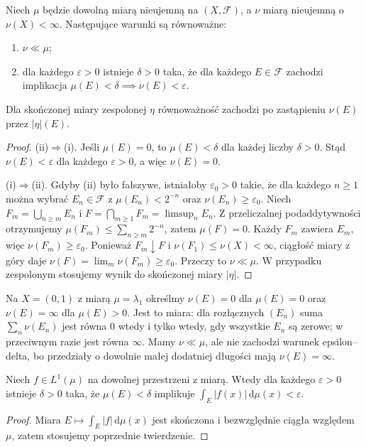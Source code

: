 \begin{twierdzenie}
\label{thm:eps-delta-ac-17}
Niech $\mu$ będzie dowolną miarą nieujemną na $(X,\mathcal F)$,
a $\nu$ miarą nieujemną o $\nu(X)<\infty$.
Następujące warunki są równoważne:
\begin{enumerate}[label=\textup{(\roman*)}]
\item $\nu\ll\mu$;
\item dla każdego $\varepsilon>0$ istnieje $\delta>0$ taka,
że dla każdego $E\in\mathcal F$ zachodzi implikacja
$\mu(E)<\delta\implies\nu(E)<\varepsilon$.
\end{enumerate}
Dla skończonej miary zespolonej $\eta$ równoważność zachodzi po
zastąpieniu $\nu(E)$ przez $|\eta|(E)$.
\end{twierdzenie}
\begin{proof}
(ii)$\Rightarrow$(i). Jeśli $\mu(E)=0$, to
$\mu(E)<\delta$ dla każdej liczby $\delta>0$.
Stąd $\nu(E)<\varepsilon$ dla każdego $\varepsilon>0$,
a więc $\nu(E)=0$.

(i)$\Rightarrow$(ii). Gdyby (ii) było fałszywe, istniałoby
$\varepsilon_0>0$ takie, że dla każdego $n\ge1$
można wybrać $E_n\in\mathcal F$ z
$\mu(E_n)<2^{-n}$ oraz $\nu(E_n)\ge\varepsilon_0$.
Niech $F_m=\bigcup_{n\ge m}E_n$ i
$F=\bigcap_{m\ge1}F_m=\limsup_nE_n$.
Z przeliczalnej podaddytywności otrzymujemy
$\mu(F_m)\le\sum_{n\ge m}2^{-n}$,
zatem $\mu(F)=0$. Każdy $F_m$ zawiera $E_m$, więc
$\nu(F_m)\ge\varepsilon_0$. Ponieważ $F_m\downarrow F$
i $\nu(F_1)\le\nu(X)<\infty$, ciągłość miary z góry daje
$\nu(F)=\lim_m\nu(F_m)\ge\varepsilon_0$.
Przeczy to $\nu\ll\mu$. W przypadku zespolonym
stosujemy wynik do skończonej miary $|\eta|$.
\end{proof}

\begin{uwaga}
Na $X=(0,1)$ z miarą $\mu=\lambda_1$ określmy
$\nu(E)=0$ dla $\mu(E)=0$ oraz $\nu(E)=\infty$
dla $\mu(E)>0$. Jest to miara: dla rozłącznych
$(E_n)$ suma $\sum_n\nu(E_n)$ jest równa $0$ wtedy
i tylko wtedy, gdy wszystkie $E_n$ są zerowe; w przeciwnym
razie jest równa $\infty$. Mamy $\nu\ll\mu$,
ale nie zachodzi warunek epsilon--delta, bo przedziały
o dowolnie małej dodatniej długości mają $\nu(E)=\infty$.
\end{uwaga}

\begin{wniosek}
\label{cor:uniform-abs-cont-int-17}
Niech $f\in L^1(\mu)$ na dowolnej przestrzeni z miarą.
Wtedy dla każdego $\varepsilon>0$ istnieje $\delta>0$ taka,
że $\mu(E)<\delta$ implikuje
$\int_E|f(x)|\,\mathrm d\mu(x)<\varepsilon$.
\end{wniosek}
\begin{proof}
Miara $E\mapsto\int_E|f|\,\mathrm d\mu(x)$ jest skończona
i bezwzględnie ciągła względem $\mu$, zatem stosujemy
poprzednie twierdzenie.
\end{proof}

